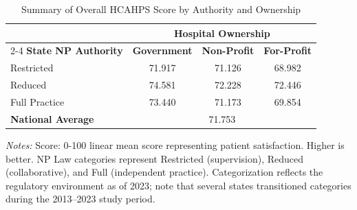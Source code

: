 \begin{table}[htbp]
    \centering
    \caption{Summary of Overall HCAHPS Score by Authority and Ownership}
    \label{tab:hcahps_100_score}
    \vspace{0.2cm}
    \begin{tabular}{lccc}
        \toprule
        & \multicolumn{3}{c}{\textbf{Hospital Ownership}} \\
        \cmidrule(lr){2-4}
        \textbf{State NP Authority} & \textbf{Government} & \textbf{Non-Profit} & \textbf{For-Profit} \\
        \midrule
        Restricted & 71.917 & 71.126 & 68.982 \\
        Reduced & 74.581 & 72.228 & 72.446 \\
        Full Practice & 73.440 & 71.173 & 69.854 \\
        \midrule
        \textbf{National Average} & \multicolumn{3}{c}{71.753} \\
        \bottomrule
    \end{tabular}
    \vspace{0.1cm}
    \begin{minipage}{0.85\textwidth}
        \footnotesize \textit{Notes:} Score: 0-100 linear mean score representing patient satisfaction. Higher is better. NP Law categories represent Restricted (supervision), Reduced (collaborative), and Full (independent practice). Categorization reflects the regulatory environment as of 2023; note that several states transitioned categories during the 2013--2023 study period.
    \end{minipage}
\end{table}